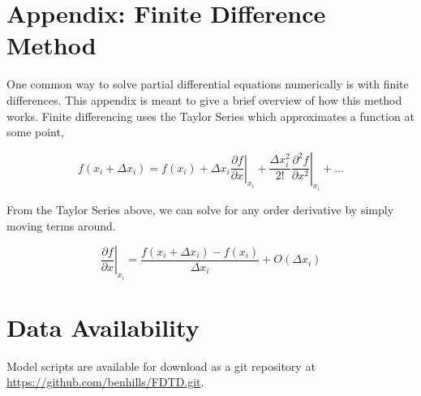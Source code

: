 \documentclass[a4paper]{article}
\begin{document}
\section{Appendix: Finite Difference Method}

One common way to solve partial differential equations numerically is with finite differences. This appendix is meant to give a brief overview of how this method works. Finite differencing uses the Taylor Series which approximates a function at some point, 

\begin{equation}
    f(x_i + \Delta x_i) = f(x_i) + \Delta x_i \left. \frac{\partial f}{\partial x} \right\vert_{x_i} + \frac{\Delta x_i^2}{2!} \left. \frac{\partial^2 f}{\partial x^2} \right\vert_{x_i} + \dots
\end{equation}

From the Taylor Series above, we can solve for any order derivative by simply moving terms around. 

\begin{equation}
    \left. \frac{\partial f}{\partial x} \right\vert_{x_i} = \frac{f(x_i + \Delta x_i) - f(x_i)}{\Delta x_i} + O(\Delta x_i)
\end{equation}

\section*{Data Availability}

Model scripts are available for download as a git repository at \url{https://github.com/benhills/FDTD.git}.

\printbibliography
\end{document}
